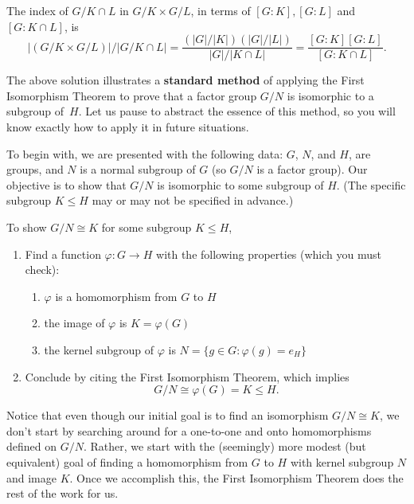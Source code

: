 \documentclass[12pt,reqno]{amsart}
\newcommand{\<}{\ensuremath{\langle}}
\renewcommand{\>}{\ensuremath{\rangle}}
\begin{document}
\begin{enumerate}
        The index of $G/K\cap L$ in $G/K \times G/L$, in terms of $[G:K], [G:L]$ and
        $[G:K\cap L]$, is
        \[
        |(G/K \times G/L)|/ |G/K\cap L| = \frac{(|G|/|K|) (|G|/|L|)}{|G|/|K\cap L|}
        = \frac{[G:K] [G:L]}{[G:K\cap L]}.
        \]

\bigskip
{} The above solution illustrates a {\bf standard method}
of applying the First Isomorphism Theorem to prove that a factor group $G/N$ is
isomorphic to a subgroup of~$H$.  Let us pause to abstract the essence
of this method, so you will know exactly how to apply it in future
situations.  

To begin with, we are presented with the following data: $G$, $N$, and $H$, are
groups, and $N$ is a normal subgroup of $G$ (so $G/N$ is a factor group). Our
objective is to show that $G/N$ is isomorphic to some subgroup of $H$.  (The
specific subgroup $K\leq H$ may or may not be specified in advance.)

 To show $G/N \cong K$ for some subgroup $K \leq H$, 
\begin{enumerate}
\item Find a function $\varphi: G \rightarrow H$ with the following properties
  (which you must check):
  \begin{enumerate}
  \item $\varphi$ is a homomorphism from $G$ to $H$
  \item the image of $\varphi$ is $K = \varphi(G)$
  \item the kernel subgroup of $\varphi$ is $N = \{g\in G: \varphi(g) = e_H\}$
  \end{enumerate}
\item Conclude by citing the First Isomorphism Theorem, which implies
  \[
  G/N \cong \varphi(G) = K\leq H.
  \]
\end{enumerate}
Notice that even though our initial goal is to find an isomorphism $G/N \cong K$,
we don't start by searching around for a one-to-one and onto homomorphisms
defined on $G/N$.
Rather, we start with the (seemingly) more modest (but equivalent) goal of
finding a homomorphism from $G$ to $H$ with kernel subgroup $N$ and image
$K$. Once we accomplish this, the First Isomorphism Theorem does the rest of the
work for us.

\bigskip


\end{enumerate}
\end{document}
